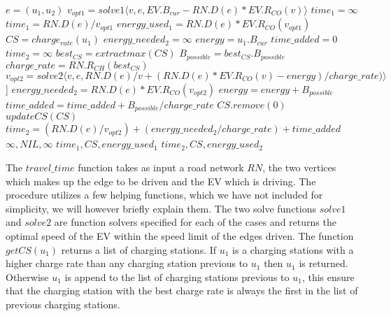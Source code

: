 \begin{algorithm}[!htb]
 \begin{algorithmic}[1]
  	\State $e = (u_1, u_2)$
  	\State $v_{opt1} = solve1\langle v, e, EV.B_{cur}-RN.D(e)*EV.R_{CO}(v)\rangle$
  		\State $time_1 = \infty$
  	\Else
 		\State $time_1 = RN.D(e) / v_{opt1}$
 		\State $energy\_used_{1} = RN.D(e)*EV.R_{CO}(v_{opt1})$
  	\EndIf
		\State $CS = charge_{rate}(u_1)$ 
  		\State $energy\_needed_{2} = \infty$
  		\State $energy = u_1.B_{cur}$
  		\State $time\_added = 0$
  		\State $time_2 = \infty$
  		\State $best_{CS} = extractmax(CS)$
  		\State $B_{possible} = best_{CS}.B_{possible}$
  		\State $charge\_rate = RN.R_{CH}(best_{CS})$
  		\State $v_{opt2} = solve2 \langle v, e,  RN.D(e)/v + (RN.D(e) * EV.R_{CO}(v)-energy)/charge\_rate) \rangle$] 
  		\State $energy\_needed_{2} = RN.D(e)*EV.R_{CO}(v_{opt2})$
  		\State $energy = energy + B_{possible}$
  			\State $time\_added = time\_added + B_{possible}/charge\_rate$
  			\State $CS.remove(0)$
  			\State $updateCS(CS)$
  		\EndIf	
  	\EndWhile
  		\State $time_2 = (RN.D(e)/v_{opt2}) + (energy\_needed_{2}/charge\_rate) + time\_added$
  	\EndIf
  		\State \Return $\infty, NIL, \infty$
  	\EndIf
  		\State \Return $time_1, CS, energy\_used_1$
  	\Else
  		\State \Return $time_2, CS, energy\_used_2$
  	\EndIf
  \EndFunction
  \end{algorithmic}\label{alg:fastest_path}
\end{algorithm}

The $travel\_time$ function takes as input a road network $RN$, the two vertices which makes up the edge to be driven and the EV which is driving. The procedure utilizes a few helping functions, which we have not included for simplicity, we will however briefly explain them. The two solve functions $solve1$ and $solve2$ are function solvers specified for each of the cases and returns the optimal speed of the EV within the speed limit of the edges driven. The function $getCS(u_1)$ returns a list of charging stations. If $u_1$ is a charging stations with a higher charge rate than any charging station previous to $u_1$ then $u_1$ is returned. Otherwise $u_1$ is append to the list of charging stations previous to $u_1$, this ensure that the charging station with the best charge rate is always the first in the list of previous charging stations. 

